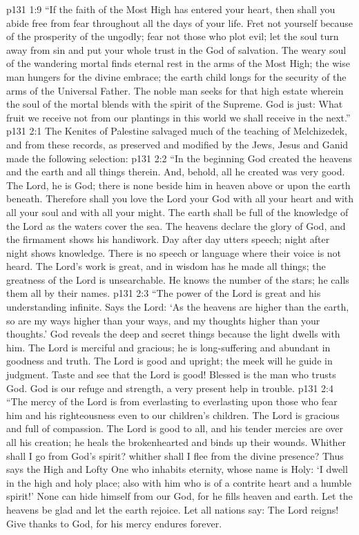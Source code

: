 \vs p131 1:9 “If the faith of the Most High has entered your heart, then shall you abide free from fear throughout all the days of your life. Fret not yourself because of the prosperity of the ungodly; fear not those who plot evil; let the soul turn away from sin and put your whole trust in the God of salvation. The weary soul of the wandering mortal finds eternal rest in the arms of the Most High; the wise man hungers for the divine embrace; the earth child longs for the security of the arms of the Universal Father. The noble man seeks for that high estate wherein the soul of the mortal blends with the spirit of the Supreme. God is just: What fruit we receive not from our plantings in this world we shall receive in the next.”
\vs p131 2:1 The Kenites of Palestine salvaged much of the teaching of Melchizedek, and from these records, as preserved and modified by the Jews, Jesus and Ganid made the following selection:
\vs p131 2:2 \pc “In the beginning God created the heavens and the earth and all things therein. And, behold, all he created was very good. The Lord, he is God; there is none beside him in heaven above or upon the earth beneath. Therefore shall you love the Lord your God with all your heart and with all your soul and with all your might. The earth shall be full of the knowledge of the Lord as the waters cover the sea. The heavens declare the glory of God, and the firmament shows his handiwork. Day after day utters speech; night after night shows knowledge. There is no speech or language where their voice is not heard. The Lord’s work is great, and in wisdom has he made all things; the greatness of the Lord is unsearchable. He knows the number of the stars; he calls them all by their names.
\vs p131 2:3 “The power of the Lord is great and his understanding infinite. Says the Lord: ‘As the heavens are higher than the earth, so are my ways higher than your ways, and my thoughts higher than your thoughts.’ God reveals the deep and secret things because the light dwells with him. The Lord is merciful and gracious; he is long\hyp{}suffering and abundant in goodness and truth. The Lord is good and upright; the meek will he guide in judgment. Taste and see that the Lord is good! Blessed is the man who trusts God. God is our refuge and strength, a very present help in trouble.
\vs p131 2:4 “The mercy of the Lord is from everlasting to everlasting upon those who fear him and his righteousness even to our children’s children. The Lord is gracious and full of compassion. The Lord is good to all, and his tender mercies are over all his creation; he heals the brokenhearted and binds up their wounds. Whither shall I go from God’s spirit? whither shall I flee from the divine presence? Thus says the High and Lofty One who inhabits eternity, whose name is Holy: ‘I dwell in the high and holy place; also with him who is of a contrite heart and a humble spirit!’ None can hide himself from our God, for he fills heaven and earth. Let the heavens be glad and let the earth rejoice. Let all nations say: The Lord reigns! Give thanks to God, for his mercy endures forever.
